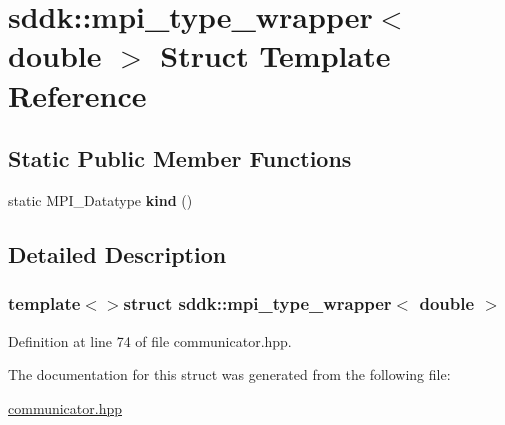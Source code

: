 \hypertarget{structsddk_1_1mpi__type__wrapper_3_01double_01_4}{}\section{sddk\+:\+:mpi\+\_\+type\+\_\+wrapper$<$ double $>$ Struct Template Reference}
\label{structsddk_1_1mpi__type__wrapper_3_01double_01_4}
\subsection*{Static Public Member Functions}
\begin{DoxyCompactItemize}
\item 
\hypertarget{structsddk_1_1mpi__type__wrapper_3_01double_01_4_a4070920d8a120da40d63ce7041c348a4}{}static M\+P\+I\+\_\+\+Datatype {\bfseries kind} ()\label{structsddk_1_1mpi__type__wrapper_3_01double_01_4_a4070920d8a120da40d63ce7041c348a4}

\end{DoxyCompactItemize}


\subsection{Detailed Description}
\subsubsection*{template$<$$>$struct sddk\+::mpi\+\_\+type\+\_\+wrapper$<$ double $>$}



Definition at line 74 of file communicator.\+hpp.



The documentation for this struct was generated from the following file\+:\begin{DoxyCompactItemize}
\item 
\hyperlink{communicator_8hpp}{communicator.\+hpp}\end{DoxyCompactItemize}
